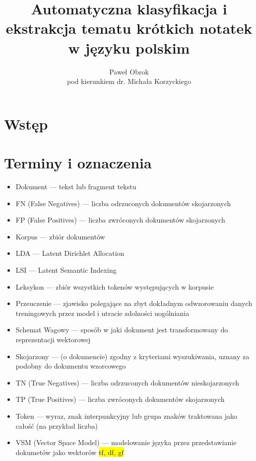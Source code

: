 \documentclass[11pt,a4paper]{article}
\newcommand{\todo}[1]{\colorbox{yellow}{#1}}
\begin{document}
\title{Automatyczna klasyfikacja i ekstrakcja tematu krótkich notatek w języku polskim}
\author{Paweł Obrok\\pod kierunkiem dr. Michała Korzyckiego}

\maketitle
\pagebreak

\tableofcontents
\pagebreak

\section{Wstęp}
\section{Terminy i oznaczenia}

\begin{itemize}
\item Dokument --- tekst lub fragment tekstu
\item FN (False Negatives) --- liczba odrzuconych dokumentów skojarzonych
\item FP (False Positives) --- liczba zwróconych dokumentów skojarzonych
\item Korpus --- zbiór dokumentów
\item LDA --- Latent Dirichlet Allocation
\item LSI --- Latent Semantic Indexing
\item Leksykon --- zbiór wszystkich tokenów występujących w korpusie
\item Przeuczenie --- zjawisko polegające na zbyt dokładnym odwzorowaniu danych treningowych przez model i utracie zdolności uogólniania
\item Schemat Wagowy --- sposób w jaki dokument jest transformowany do reprezentacji wektorowej
\item Skojarzony --- (o dokumencie) zgodny z kryteriami wyszukiwania, uznany za podobny do dokumentu wzorcowego
\item TN (True Negatives) --- liczba odrzuconych dokumentów nieskojarzonych
\item TP (True Positives) --- liczba zwróconych dokumentów skojarzonych
\item Token --- wyraz, znak interpunkcyjny lub grupa znaków traktowana jako całość (na przykład liczba)
\item VSM (Vector Space Model) --- modelowanie języka przez przedstawianie dokumetów jako wektorów
\todo{tf, df, gf}
\end{itemize}
\end{document}
